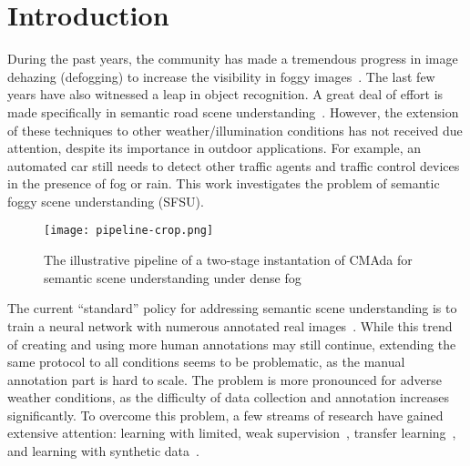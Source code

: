 \documentclass[twocolumn]{svjour3}          \smartqed  \usepackage{graphicx}
\begin{document}
\section{Introduction}
\label{intro}


During the past years, the community has made a tremendous progress in image dehazing (defogging) to increase the visibility in foggy images~\cite{bayesian:defogging,dark:channel,dehazing:mscale:depth}. The last few years have also witnessed a leap in object recognition. A great deal of effort is made specifically in semantic road scene understanding~\cite{road:scene:eccv12,Cityscapes,Tealtime3DTrafficConeDetection}. However, the extension of these techniques to other weather/illumination conditions has not received due attention, despite its importance in outdoor applications. For example, an automated car still needs to detect other traffic agents and traffic control devices in the presence of fog or rain. This work investigates the problem of semantic foggy scene understanding (SFSU).

\begin{figure*}[t]
  \centering
  \texttt{[image: pipeline-crop.png]}
  \caption{The illustrative pipeline of a two-stage instantation of CMAda for semantic scene understanding under dense fog}
  \label{fig:pipeline}
\end{figure*}


The current ``standard'' policy for addressing semantic scene understanding is to train a neural network with numerous annotated real images~\cite{pascal:2011,imagenet:2015,Cityscapes}. While this trend of creating and using more human annotations may still continue, extending the same protocol to all conditions seems to be problematic, as the manual annotation part is hard to scale.
The problem is more pronounced for adverse weather conditions, as the difficulty of data collection and annotation increases significantly. To overcome this problem, a few streams of research have gained extensive attention: learning with limited, weak supervision~\cite{dai:EnPro:iccv13,Misra_2015_CVPR}, transfer learning~\cite{LSDA:nips:14,DomainAdaptiveFasterRCNN}, and learning with synthetic data~\cite{Synthia:dataset,SFSU_synthetic}.  
\end{document}
